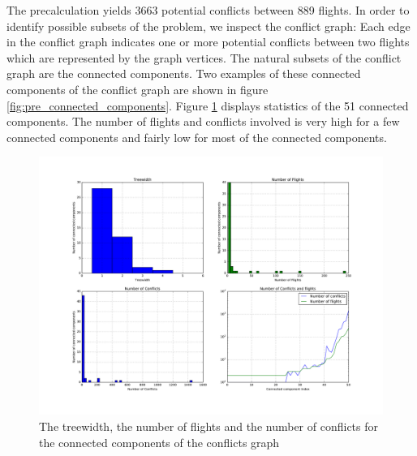 \documentclass{article}
\begin{document}
The precalculation yields 3663 potential conflicts between 889 flights.
In order to identify possible subsets of the problem, we inspect the conflict graph: Each edge in the conflict graph indicates one or more potential conflicts between two flights which are represented by the graph vertices.
The natural subsets of the conflict graph are the connected components.
Two examples of these connected components of the conflict graph are shown in figure \ref{fig:pre_connected_components}.
Figure \ref{fig:pre_connected_components_statistics} displays statistics of the 51 connected components.
The number of flights and conflicts involved is very high for a few connected components and fairly low for most of the connected components.
\begin{figure}[htpb]
    \centering
    \includegraphics[width=1.0\linewidth]{pics/conflict_graph_connected_components_analysis.pdf}
    \caption{The treewidth, the number of flights and the number of conflicts for the connected components of the conflicts graph}
    \label{fig:pre_connected_components_statistics}
\end{figure}
\end{document}

